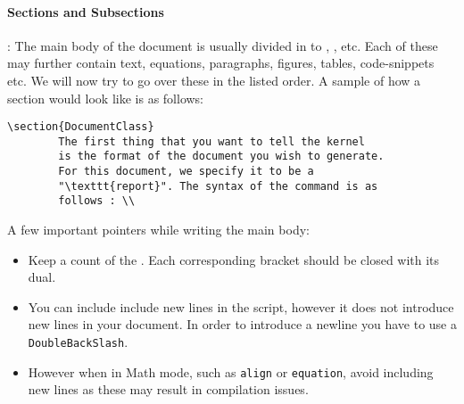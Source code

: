 \paragraph{Sections and Subsections}: 
The main body of the document is usually divided in to , ,  etc. Each of these may further contain text, equations, paragraphs, figures, tables, code-snippets etc. We will now try to go over these in the listed order. A sample of how a section would look like is as follows: 
\begin{lstlisting}[frame=single]
		\section{DocumentClass}
		The first thing that you want to tell the kernel
		is the format of the document you wish to generate.
		For this document, we specify it to be a
		"\texttt{report}". The syntax of the command is as
		follows : \\
\end{lstlisting}
A few important pointers while writing the main body: 
\begin{itemize}
\item Keep a count of the \tet{brackets "\{", "\ [", "\ (" }. Each corresponding bracket should be closed with its dual. 
\item You can include include new lines in the script, however it does not introduce new lines in your document. In order to introduce a newline you have to use a \texttt{DoubleBackSlash}.
\item However when in Math mode, such as \texttt{align} or \texttt{equation}, avoid including new lines as these may result in compilation issues. 
\end{itemize}
\newpage
